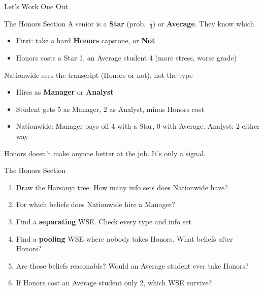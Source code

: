 \begin{frame}[standout]
Let's Work One Out
\end{frame}

\begin{frame}{The Honors Section}
A senior is a \textbf{Star} (prob.\ $\tfrac13$) or \textbf{Average}. They know which
\begin{itemize}
    \item First: take a hard \textbf{Honors} capstone, or \textbf{Not}
    \item Honors costs a Star 1, an Average student 4 (more stress, worse grade)
\end{itemize}
\bsk
Nationwide sees the transcript (Honors or not), not the type
\begin{itemize}
    \item Hires as \textbf{Manager} or \textbf{Analyst}
    \item Student gets 5 as Manager, 2 as Analyst, minus Honors cost
    \item Nationwide: Manager pays off 4 with a Star, 0 with Average. Analyst: 2 either way
\end{itemize}
\vfill
{\footnotesize Honors doesn't make anyone better at the job. It's only a signal.}
\vspace{-0.2in}
\end{frame}

\begin{frame}{The Honors Section}
\begin{enumerate}
    \item Draw the Harsanyi tree. How many info sets does Nationwide have? \vspace{0.25in}
    \item For which beliefs does Nationwide hire a Manager? \vspace{0.25in}
    \item Find a \textbf{separating} WSE. Check every type and info set \vspace{0.35in}
    \item Find a \textbf{pooling} WSE where nobody takes Honors. What beliefs after Honors? \vspace{0.3in}
    \item Are those beliefs reasonable? Would an Average student ever take Honors? \vspace{0.2in}
    \item If Honors cost an Average student only 2, which WSE survive? \vspace{0.1in}
\end{enumerate}
\vspace{-0.3in}
\end{frame}

